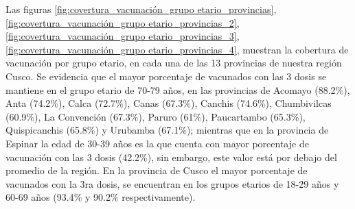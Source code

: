 \documentclass[12pt,a4paper,openany]{book}
\begin{document}
	
	Las figuras \ref{fig:covertura_vacunación_grupo etario_provincias}, \ref{fig:covertura_vacunación_grupo etario_provincias_2}, \ref{fig:covertura_vacunación_grupo etario_provincias_3}, \ref{fig:covertura_vacunación_grupo etario_provincias_4},
	muestran la cobertura de vacunación por grupo etario, en cada una de las 13 provincias de nuestra región Cusco. Se evidencia que el mayor porcentaje de vacunados con las 3 dosis se mantiene en el grupo etario de 70-79 años, en las provincias de Acomayo (88.2$\%$), Anta (74.2$\%$), Calca (72.7$\%$), Canas (67.3$\%$), Canchis (74.6$\%$), Chumbivilcas (60.9$\%$), La Convención (67.3$\%$), Paruro (61$\%$), Paucartambo (65.3$\%$), Quispicanchis (65.8$\%$) y Urubamba (67.1$\%$); mientras que en la provincia de Espinar la edad de 30-39 años es la que cuenta con mayor porcentaje de vacunación con las 3 dosis (42.2$\%$), sin embargo, este valor está por debajo del promedio de la región. En la provincia de Cusco el mayor porcentaje de vacunados con la 3ra dosis, se encuentran en los grupos etarios de 18-29 años y 60-69 años (93.4$\%$ y 90.2$\%$ respectivamente).
	
\end{document}
